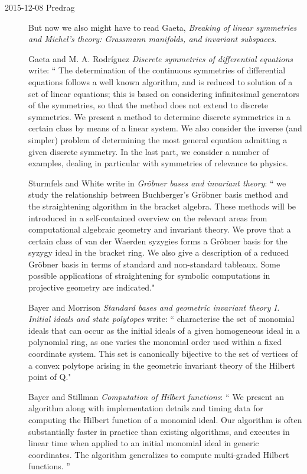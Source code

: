 \begin{description}
\item[2015-12-08 Predrag]
But now we also might have to read Gaeta,
{\em Breaking of linear symmetries and Michel's theory: Grassmann
manifolds, and invariant subspaces}.

Gaeta and M. A. Rodr\'iguez
{\em Discrete symmetries of differential equations} write: ``
The determination of the continuous symmetries of differential equations
follows a well known algorithm, and is reduced to solution of a set of
linear equations; this is based on considering infinitesimal generators
of the symmetries, so that the method does not extend to discrete
symmetries. We present a method to determine discrete symmetries in a
certain class by means of a linear system. We also consider the inverse
(and simpler) problem of determining the most general equation admitting
a given discrete symmetry. In the last part, we consider a number of
examples, dealing in particular with symmetries of relevance to physics.

Sturmfels and White
write in {\em Gr\"obner bases and invariant theory}: ``
we study the relationship between Buchberger's Gr{\"o}bner basis method and
the straightening algorithm in the bracket algebra. These methods will be
introduced in a self-contained overview on the relevant areas from
computational algebraic geometry and invariant theory. We prove that a
certain class of van der Waerden syzygies forms a Gr{\"o}bner basis for the
syzygy ideal in the bracket ring. We also give a description of a reduced
Gr{\"o}bner basis in terms of standard and non-standard tableaux. Some
possible applications of straightening for symbolic computations in
projective geometry are indicated."

Bayer and Morrison {\em Standard bases and geometric
invariant theory {I. Initial} ideals and state polytopes} write: ``
characterise the set of monomial ideals that can occur as the initial
ideals of a given homogeneous ideal in a polynomial ring, as one varies
the monomial order used within a fixed coordinate system. This set is
canonically bijective to the set of vertices of a convex polytope arising
in the geometric invariant theory of the Hilbert point of Q."

Bayer and Stillman {\em Computation of {Hilbert}
functions}: ``
We present an algorithm along with implementation details and timing data
for computing the Hilbert function of a monomial ideal. Our algorithm is
often substantially faster in practice than existing algorithms, and
executes in linear time when applied to an initial monomial ideal in
generic coordinates. The algorithm generalizes to compute multi-graded
Hilbert functions.
''


\end{description}
